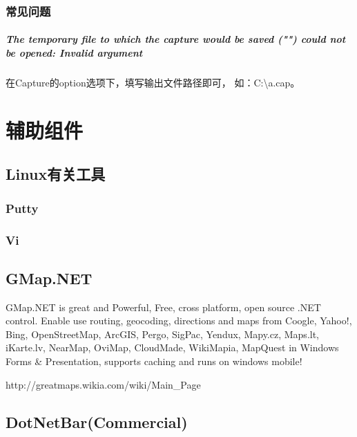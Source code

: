 \documentclass{book}
\begin{document}
\subsection{常见问题}

\paragraph{The temporary file to which the capture would be saved ("") could not be opened: Invalid argument}

在Capture的option选项下，填写输出文件路径即可，
如：C:\textbackslash a.cap。


\chapter{辅助组件}

\clearpage

\section{Linux有关工具}






\subsection{Putty}

\subsection{Vi}

\section{GMap.NET}

GMap.NET is great and Powerful, Free, cross platform, open source .NET control. 
Enable use routing, geocoding, directions and maps from Coogle, Yahoo!, 
Bing, OpenStreetMap, ArcGIS, Pergo, SigPac, Yendux, Mapy.cz, 
Maps.lt, iKarte.lv, NearMap, OviMap, CloudMade, WikiMapia, 
MapQuest in Windows Forms \& Presentation, supports caching and runs on windows mobile!

http://greatmaps.wikia.com/wiki/Main\_Page

\section{DotNetBar(Commercial)}
\end{document}
